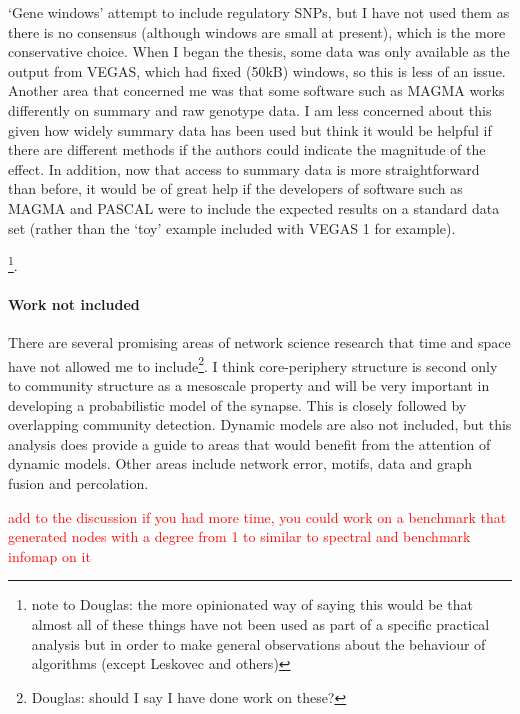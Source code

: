   
  `Gene windows'  attempt to include regulatory SNPs, but I have not used them as there is no consensus (although windows are small at present), which is the more conservative choice. When I began the thesis, some data was only available as the output from VEGAS, which had fixed (50kB) windows, so this is less of an issue. Another area that concerned me was that some software such as MAGMA works differently on summary and raw genotype data. I am less concerned about this given how widely summary data has been used but think it would be helpful if there are different methods if the authors could indicate the magnitude of the effect. In addition, now that access to summary data is more straightforward than before, it would be of great help if the developers of software such as MAGMA and PASCAL were to include the expected results on a standard data set (rather than the `toy' example included with VEGAS 1 for example). 
  
  
  \footnote{note to Douglas: the more opinionated way of saying this would be that almost all of these things have not been used as part of a specific practical analysis but in order to make general observations about the behaviour of algorithms (except Leskovec\cite{leskovec2010empirical} and others)}. 
  
   \paragraph{Work not included}
There are several promising areas of network science research that time and space have not allowed me to include\footnote{Douglas: should I say I have done work on these?}. I think core-periphery structure is second only to community structure as a mesoscale property and will be very important in developing a probabilistic model of the synapse. This is closely followed by overlapping community detection.  Dynamic models are also not included, but this analysis does provide a guide to areas that would benefit from the attention of dynamic models. Other areas include network error, motifs, data and graph fusion and percolation. 
 
 \textcolor{red}{add to the discussion if you had more time, you could work on a benchmark that generated nodes with a degree from 1 to similar to spectral and benchmark infomap on it}


